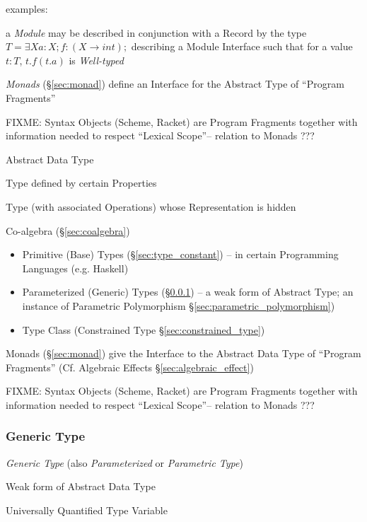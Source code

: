 examples:

a \emph{Module} may be described in conjunction with a Record by the type $T =
\exists X { a : X; f : (X \rightarrow int); }$ describing a Module Interface
such that for a value $t : T$, $t.f (t.a)$ is \emph{Well-typed}

\emph{Monads} (\S\ref{sec:monad}) define an Interface for the Abstract
Type of ``Program Fragments''

FIXME: Syntax Objects (Scheme, Racket) are Program Fragments together
with information needed to respect ``Lexical Scope''-- relation to
Monads ???


\asterism


Abstract Data Type

Type defined by certain Properties %

Type (with associated Operations) whose Representation is hidden

Co-algebra (\S\ref{sec:coalgebra})

\begin{itemize}
  \item Primitive (Base) Types (\S\ref{sec:type_constant}) -- in
    certain Programming Languages (e.g. Haskell)
  \item Parameterized (Generic) Types (\S\ref{sec:generic_type}) -- a
    weak form of Abstract Type; an instance of Parametric Polymorphism
    \S\ref{sec:parametric_polymorphism})
  \item Type Class (Constrained Type \S\ref{sec:constrained_type})
\end{itemize}

Monads (\S\ref{sec:monad}) give the Interface to the Abstract Data
Type of ``Program Fragments'' (\fist Cf. Algebraic Effects
\S\ref{sec:algebraic_effect})

FIXME: Syntax Objects (Scheme, Racket) are Program Fragments together
with information needed to respect ``Lexical Scope''-- relation to
Monads ???



\subsubsection{Generic Type}\label{sec:generic_type}

\emph{Generic Type} (also \emph{Parameterized} or \emph{Parametric
  Type})

Weak form of Abstract Data Type

Universally Quantified Type Variable

